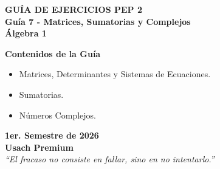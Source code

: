 \documentclass[letterpaper, 12pt]{article}
\begin{document}
\vspace*{0.5cm} 

\begin{center}
\color{azulFuerte}
{\huge \textbf{GUÍA DE EJERCICIOS PEP 2}} \\
\vspace{0.5cm}
{\Large \textbf{Guía 7 - Matrices, Sumatorias y Complejos}} \\
\vspace{0.5cm}
{\Huge \textbf{Álgebra 1}} \\
\vspace{1.5cm}
\begin{tcolorbox}[colback=celesteSuave, colframe=azulFuerte, arc=10pt, width=0.85\textwidth, center, boxrule=1.5pt]
\centering
\vspace{0.2cm}
{\Large \textbf{Contenidos de la Guía}}
\vspace{0.3cm}
\color{black}
\begin{itemize}[leftmargin=3cm]
\item[\color{azulFuerte} $\Rightarrow$] Matrices, Determinantes y Sistemas de Ecuaciones.
\item[\color{azulFuerte} $\Rightarrow$] Sumatorias.
\item[\color{azulFuerte} $\Rightarrow$] Números Complejos.
\end{itemize}
\vspace{0.2cm}
\end{tcolorbox}
\end{center}

\vspace{0.5cm}
\begin{center}
{\Large \textbf{1er. Semestre de 2026}} \\
\vspace{1.3cm}
{\large \textbf{Usach Premium}} \\
\vspace{1.5cm}
\textit{``El fracaso no consiste en fallar, sino en no intentarlo.''}
\end{center}

\newpage
{}
\thispagestyle{fancy}
\end{document}
